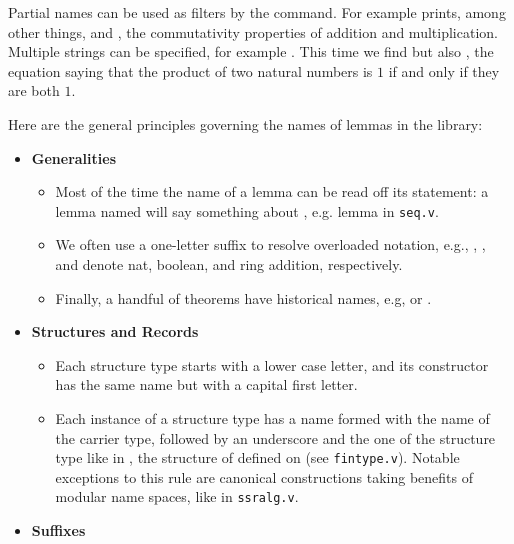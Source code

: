 Partial names can be used as filters by the  command. For example
 prints, among other things,  and ,
the commutativity properties of addition and multiplication.  Multiple
strings can be specified, for example .  This time
we find  but also , the equation saying that
the product of two natural numbers is $1$ if and only if they are both $1$.

Here are the general principles governing the names of lemmas
in the \mcbMC{} library:
\begin{itemize}
\item{\bf Generalities}
  \begin{itemize}
  \item Most of the time the name of a lemma can be read off its
    statement: a lemma named  will say something about
    , e.g. lemma  in
    {\tt seq.v}.
  \item We often use a one-letter suffix to resolve overloaded
    notation, e.g., , , and  denote nat, boolean, and
    ring
    addition, respectively.
  \item Finally, a handful of theorems have historical names,
    e.g,  or .
  \end{itemize}
\item{\bf Structures and Records}
  \begin{itemize}
  \item Each structure type starts with a
    lower case letter, and its constructor has the same name but with a
    capital first letter.
  \item Each instance of a structure type has a name formed with the
    name of the carrier type, followed by an underscore and the one of
    the structure type like in , the structure of
     defined on  (see {\tt fintype.v}). Notable
    exceptions to this rule are canonical constructions taking
    benefits of modular name spaces, like in {\tt ssralg.v}.
  \end{itemize}
\item {\bf Suffixes}
  \begin{itemize}

\end{itemize}
\end{itemize}
